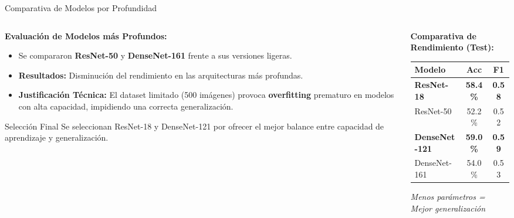\documentclass[aspectratio=169]{beamer}
\begin{document}
\begin{frame}{Comparativa de Modelos por Profundidad}

    \begin{columns}[T]
        \begin{column}{0.55\textwidth}
            \textbf{Evaluación de Modelos más Profundos:}
            \vspace{0.2cm}
            \begin{itemize}
                \item Se compararon \textbf{ResNet-50} y \textbf{DenseNet-161} frente a sus versiones ligeras.
                \item \textbf{Resultados:} Disminución del rendimiento en las arquitecturas más profundas.
                \item \textbf{Justificación Técnica:} El dataset limitado (500 imágenes) provoca \textbf{overfitting} prematuro en modelos con alta capacidad, impidiendo una correcta generalización.
            \end{itemize}

            \vspace{0.3cm}
            \begin{block}{Selección Final}
                \small
                Se seleccionan ResNet-18 y DenseNet-121 por ofrecer el mejor balance entre capacidad de aprendizaje y generalización.
            \end{block}
        \end{column}

        \begin{column}{0.42\textwidth}
            \textbf{Comparativa de Rendimiento (Test):}
            \vspace{0.2cm}
            \begin{table}
                \small
                \centering
                \begin{tabular}{lcc}
                    \toprule
                    \textbf{Modelo} & \textbf{Acc} & \textbf{F1} \\
                    \midrule
                    \rowcolor{green!20} \textbf{ResNet-18} & \textbf{58.4\%} & \textbf{0.58} \\
                    ResNet-50 & 52.2\% & 0.52 \\
                    \midrule
                    \rowcolor{green!20} \textbf{DenseNet-121} & \textbf{59.0\%} & \textbf{0.59} \\
                    DenseNet-161 & 54.0\% & 0.53 \\
                    \bottomrule
                \end{tabular}
            \end{table}
            \vspace{0.1cm}
            \centering\footnotesize\textit{Menos parámetros = Mejor generalización}
        \end{column}
    \end{columns}

\end{frame}
\end{document}
